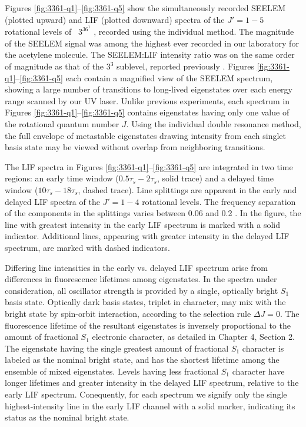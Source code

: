 \documentclass[12pt]{mitthesis}
\begin{document}
Figures \ref{fig:3361-q1}--\ref{fig:3361-q5} show the simultaneously
recorded SEELEM (plotted upward) and LIF (plotted downward) spectra of
the $J'=1-5$ rotational levels of \astate\ $3^36^1$ , recorded
using the individual method.  The magnitude of the SEELEM signal was
among the highest ever recorded in our laboratory for the acetylene
molecule. The SEELEM:LIF intensity ratio was on the same order of
magnitude as that of the $3^3$  sublevel, reported previously
\cite{mishra04}. Figures \ref{fig:3361-q1}--\ref{fig:3361-q5} each
contain a magnified view of the SEELEM spectrum, showing a large
number of transitions to long-lived eigenstates over each energy range
scanned by our UV laser.  Unlike previous experiments, each spectrum
in Figures \ref{fig:3361-q1}--\ref{fig:3361-q5} contains eigenstates
having only one value of the rotational quantum number $J$.  Using the
individual double resonance method, the full envelope of metastable
eigenstates drawing intensity from each singlet basis state may be
viewed without overlap from neighboring transitions.

The LIF spectra in Figures \ref{fig:3361-q1}--\ref{fig:3361-q5} are
integrated in two time regions: an early time window
($0.5\tau_s-2\tau_s$, solid trace) and a delayed time window
($10\tau_s-18\tau_s$, dashed trace).  Line splittings are apparent in
the early and delayed LIF spectra of the $J'=1-4$ rotational levels.
The frequency separation of the components in the splittings varies
between 0.06 and 0.2 \rcm.  In the figure, the line with greatest
intensity in the early LIF spectrum is marked with a solid indicator.
Additional lines, appearing with greater intensity in the delayed LIF
spectrum, are marked with dashed indicators.

Differing line intensities in the early vs. delayed LIF spectrum arise
from differences in fluorescence lifetimes among eigenstates.  In the
spectra under consideration, all oscillator strength is provided by a
single, optically bright $S_1$ basis state.  Optically dark basis
states, triplet in character, may mix with the bright state by
spin-orbit interaction, according to the selection rule $\Delta J =
0$.  The fluorescence lifetime of the resultant eigenstates is
inversely proportional to the amount of fractional $S_1$ electronic
character, as detailed in Chapter 4, Section 2.  The eigenstate having
the single greatest amount of fractional $S_1$ character is labeled as
the nominal bright state, and has the shortest lifetime among the
ensemble of mixed eigenstates.  Levels having less fractional $S_1$
character have longer lifetimes and greater intensity in the delayed
LIF spectrum, relative to the early LIF spectrum.  Conequently, for
each spectrum we signify only the single highest-intensity line in the
early LIF channel with a solid marker, indicating its status as the
nominal bright state.
\end{document}
